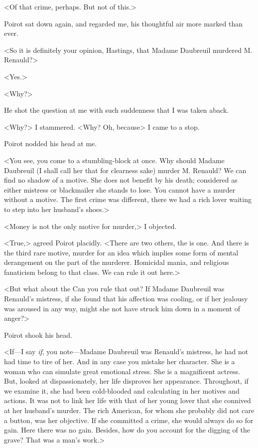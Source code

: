  <Of that crime, perhaps. But not of this.> 

 Poirot sat down again, and regarded me, his thoughtful air more marked than ever. 

 <So it is definitely your opinion, Hastings, that Madame Daubreuil murdered M. Renauld?> 

 <Yes.> 

 <Why?> 

 He shot the question at me with such suddenness that I was taken aback. 

 <Why?> I stammered. <Why? Oh, because\longdash> I came to a stop. 

 Poirot nodded his head at me. 

 <You see, you come to a stumbling-block at once. Why should Madame Daubreuil (I shall call her that for clearness sake) murder M. Renauld? We can find no shadow of a motive. She does not benefit by his death; considered as either mistress or blackmailer she stands to lose. You cannot have a murder without a motive. The first crime was different, there we had a rich lover waiting to step into her husband's shoes.> 

 <Money is not the only motive for murder,> I objected. 

 <True,> agreed Poirot placidly. <There are two others, the  is one. And there is the third rare motive, murder for an idea which implies some form of mental derangement on the part of the murderer. Homicidal mania, and religious fanaticism belong to that class. We can rule it out here.> 

 <But what about the  Can you rule that out? If Madame Daubreuil was Renauld's mistress, if she found that his affection was cooling, or if her jealousy was aroused in any way, might she not have struck him down in a moment of anger?> 

 Poirot shook his head. 

 <If—I say \emph{if}, you note—Madame Daubreuil was Renauld's mistress, he had not had time to tire of her. And in any case you mistake her character. She is a woman who can simulate great emotional stress. She is a magnificent actress. But, looked at dispassionately, her life disproves her appearance. Throughout, if we examine it, she had been cold-blooded and calculating in her motives and actions. It was not to link her life with that of her young lover that she connived at her husband's murder. The rich American, for whom she probably did not care a button, was her objective. If she committed a crime, she would always do so for gain. Here there was no gain. Besides, how do you account for the digging of the grave? That was a man's work.> 

